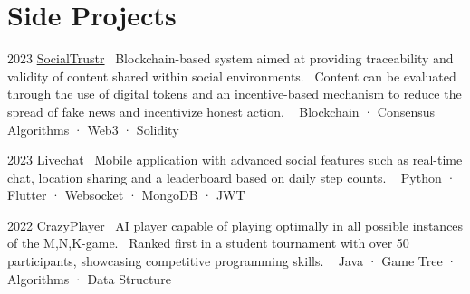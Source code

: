 \documentclass{tccv}
\begin{document}
\section{Side Projects}

\begin{yearlist}

\item{2023}
     {\href{https://github.com/manuelarto/socialtrustr}{SocialTrustr}}
     {\textbullet~Blockchain-based system aimed at providing traceability and validity of content shared within social environments.
     \textbullet~Content can be evaluated through the use of digital tokens and an incentive-based mechanism to reduce the spread of fake news and incentivize honest action. \newline
     \textbullet~ Blockchain · Consensus Algorithms · Web3 · Solidity}
\item{2023}
     {\href{https://github.com/manuelarto/livechat}{Livechat}}
     {\textbullet~Mobile application with advanced social features such as real-time chat, location sharing and a leaderboard based on daily step counts. \newline
    \textbullet~ Python · Flutter · Websocket · MongoDB · JWT}
\item{2022}
     {\href{https://github.com/manuelarto/crazyplayer}{CrazyPlayer}}
     {\textbullet~AI player capable of playing optimally in all possible instances of the M,N,K-game. \newline
     \textbullet~Ranked first in a student tournament with over 50 participants, showcasing competitive programming skills. \newline
    \textbullet~ Java · Game Tree · Algorithms · Data Structure}

\end{yearlist}





\end{document}
